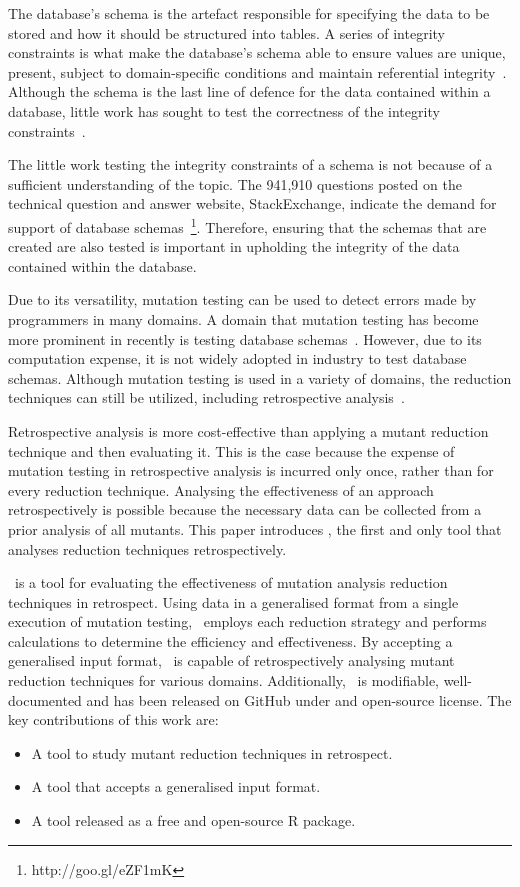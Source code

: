 The database's schema is the artefact responsible for specifying the data to be stored and how it should be structured
into tables. A series of integrity constraints is what make the database's schema able to ensure values are unique,
present, subject to domain-specific conditions and maintain referential integrity~\cite{mcminn2016virtual}.  Although
the schema is the last line of defence for the data contained within a database, little work has sought to test the
correctness of the integrity constraints~\cite{mcminn2015effectiveness}.




The little work testing the integrity constraints of a schema is not because of a sufficient understanding of the topic.
The 941,910 questions posted on the technical question and answer website, StackExchange, indicate the demand for
support of database schemas~\footnote{http://goo.gl/eZF1mK}. Therefore, ensuring that the schemas that are created are
also tested is important in upholding the integrity of the data contained within the database.

Due to its versatility, mutation testing can be used to detect errors made by programmers in many domains.  A domain
that mutation testing has become more prominent in recently is testing database schemas~\cite{mcminn2016virtual,
mcminn2015effectiveness, wright2013efficient}. However, due to its computation expense, it is not widely adopted in
industry to test database schemas.  Although mutation testing is used in a variety of domains, the reduction techniques
can still be utilized, including retrospective analysis~\cite{jia2011analysis, wong1995reducing, offutt1993experimental,
offutt2001mutation}.

Retrospective analysis is more cost-effective than applying a mutant reduction technique and then evaluating it.  This
is the case because the expense of mutation testing in retrospective analysis is incurred only once, rather than for
every reduction technique. Analysing the effectiveness of an approach retrospectively is possible because the necessary
data can be collected from a prior analysis of all mutants.  This paper introduces \mr, the first and only tool that
analyses reduction techniques retrospectively.

\mr~is a tool for evaluating the effectiveness of mutation analysis reduction techniques in retrospect. Using data in a
generalised format from a single execution of mutation testing, \mr~employs each reduction strategy and performs
calculations to determine the efficiency and effectiveness. By accepting a generalised input format, \mr~is capable of
retrospectively analysing mutant reduction techniques for various domains.  Additionally, \mr~is modifiable,
well-documented and has been released on GitHub under and open-source license. The key contributions of this work are:

    \begin{itemize}
        \item A tool to study mutant reduction techniques in retrospect.
        \item A tool that accepts a generalised input format.
        \item A tool released as a free and open-source R package.
    \end{itemize}
